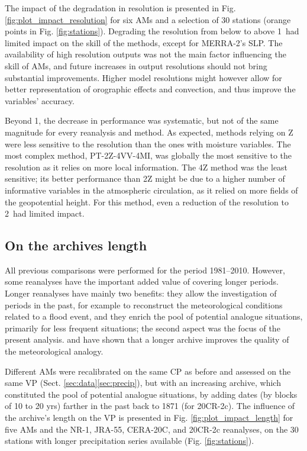 \documentclass{ametsoc}
\begin{document}
	The impact of the degradation in resolution is presented in Fig. \ref{fig:plot_impact_resolution} for six AMs and a selection of 30 stations (orange points in Fig. \ref{fig:stations}). Degrading the resolution from below to above 1\degree\ had limited impact on the skill of the methods, except for MERRA-2's SLP. The availability of high resolution outputs was not the main factor influencing the skill of AMs, and future increases in output resolutions should not bring substantial improvements. Higher model resolutions might however allow for better representation of orographic effects and convection, and thus improve the variables' accuracy. 
	
	Beyond 1\degree, the decrease in performance was systematic, but not of the same magnitude for every reanalysis and method. As expected, methods relying on Z were less sensitive to the resolution than the ones with moisture variables. The most complex method, PT-2Z-4VV-4MI, was globally the most sensitive to the resolution as it relies on more local information. The 4Z method was the least sensitive; its better performance than 2Z might be due to a higher number of informative variables in the atmospheric circulation, as it relied on more fields of the geopotential height. For this method, even a reduction of the resolution to 2\degree\ had limited impact.
	
	
	\subsection{On the archives length}
	\label{sec:length}
	
	All previous comparisons were performed for the period 1981--2010. However, some reanalyses have the important added value of covering longer periods. Longer reanalyses have mainly two benefits: they allow the investigation of periods in the past, for example to reconstruct the meteorological conditions related to a flood event, and they enrich the pool of potential analogue situations, primarily for less frequent situations; the second aspect was the focus of the present analysis. \citet{Ruosteenoja1988} and \citet{Vandendool1994} have shown that a longer archive improves the quality of the meteorological analogy.
	
	Different AMs were recalibrated on the same CP as before and assessed on the same VP (Sect. \ref{sec:data}\ref{sec:precip}), but with an increasing archive, which constituted the pool of potential analogue situations, by adding dates (by blocks of 10 to 20 yrs) farther in the past back to 1871 (for 20CR-2c). The influence of the archive's length on the VP is presented in Fig. \ref{fig:plot_impact_length} for five AMs and the NR-1, JRA-55, CERA-20C, and 20CR-2c reanalyses, on the 30 stations with longer precipitation series available (Fig. \ref{fig:stations}). 
	
\end{document}
